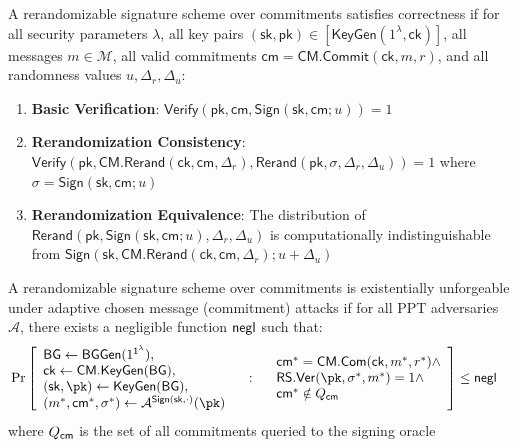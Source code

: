 \begin{definition}[Correctness]
A rerandomizable signature scheme over commitments satisfies correctness if for all security parameters $\lambda$, all key pairs $(\mathsf{sk}, \mathsf{pk}) \in [\mathsf{KeyGen}(1^\lambda, \mathsf{ck})]$, all messages $m \in \mathcal{M}$, all valid commitments $\mathsf{cm} = \mathsf{CM.Commit}(\mathsf{ck}, m, r)$, and all randomness values $u, \Delta_r, \Delta_u$:

\begin{enumerate}
    \item \textbf{Basic Verification}: $\mathsf{Verify}(\mathsf{pk}, \mathsf{cm}, \mathsf{Sign}(\mathsf{sk}, \mathsf{cm}; u)) = 1$
    
    \item \textbf{Rerandomization Consistency}: $\mathsf{Verify}(\mathsf{pk}, \mathsf{CM.Rerand}(\mathsf{ck}, \mathsf{cm}, \Delta_r), \mathsf{Rerand}(\mathsf{pk}, \sigma, \Delta_r, \Delta_u)) = 1$ where $\sigma = \mathsf{Sign}(\mathsf{sk}, \mathsf{cm}; u)$
    
    \item \textbf{Rerandomization Equivalence}: The distribution of $\mathsf{Rerand}(\mathsf{pk}, \mathsf{Sign}(\mathsf{sk}, \mathsf{cm}; u), \Delta_r, \Delta_u)$ is computationally indistinguishable from $\mathsf{Sign}(\mathsf{sk}, \mathsf{CM.Rerand}(\mathsf{ck}, \mathsf{cm}, \Delta_r); u+\Delta_u)$
\end{enumerate}
\end{definition}


\begin{definition}
A rerandomizable signature scheme over commitments is existentially unforgeable under adaptive chosen message (commitment) attacks if for all PPT adversaries $\mathcal{A}$, there exists a negligible function $\mathsf{negl}$ such that:
    \begin{align*}
        &\Pr\left[
            \begin{array}{l}
                \mathsf{BG} \gets \mathsf{BGGen}(1^{\secparam}), \\
                \mathsf{ck} \gets \mathsf{CM.KeyGen}(\mathsf{BG}), \\
                (\sk, \pk) \gets \mathsf{KeyGen}(\mathsf{BG}), \\
                (m^*, \cm^*, \sigma^*) \gets \mathcal{A}^{\mathsf{Sign}(\sk, \cdot)}(\pk) \\
                \end{array}
                \quad : \quad
                \begin{array}{l}
                \cm^* = \mathsf{CM.Com}(\mathsf{ck}, m^*, r^*) \land \\
                \mathsf{RS.Ver}(\pk, \sigma^*, m^*) = 1 \land \\
                \cm^* \notin Q_{\cm}
            \end{array}
        \right] \leq \negl
    \end{align*}
where $Q_{\mathsf{cm}}$ is the set of all commitments queried to the signing oracle
\end{definition}




